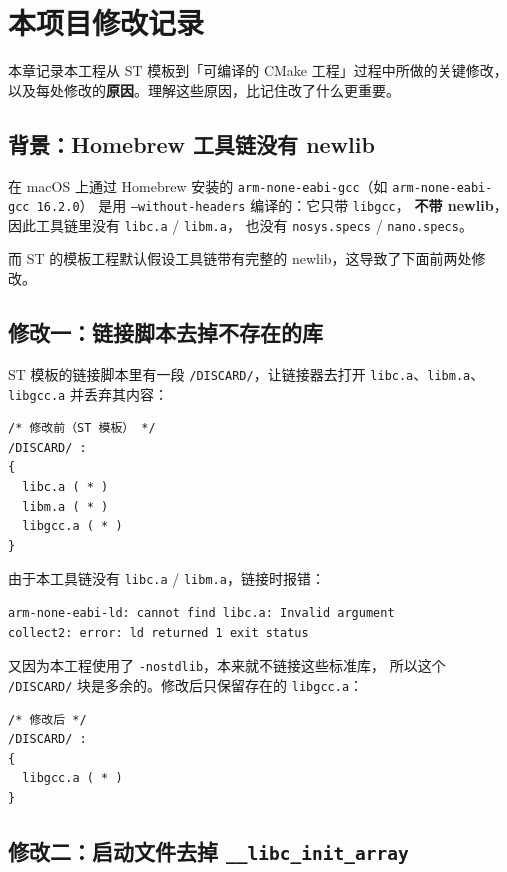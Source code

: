 \section{本项目修改记录}

本章记录本工程从 ST 模板到「可编译的 CMake 工程」过程中所做的关键修改，
以及每处修改的\textbf{原因}。理解这些原因，比记住改了什么更重要。

\subsection{背景：Homebrew 工具链没有 newlib}

在 macOS 上通过 Homebrew 安装的
\texttt{arm-none-eabi-gcc}（如 \texttt{arm-none-eabi-gcc 16.2.0}）
是用 \texttt{--without-headers} 编译的：它只带 \texttt{libgcc}，
\textbf{不带 newlib}，因此工具链里没有 \texttt{libc.a} / \texttt{libm.a}，
也没有 \texttt{nosys.specs} / \texttt{nano.specs}。

而 ST 的模板工程默认假设工具链带有完整的 newlib，这导致了下面前两处修改。

\subsection{修改一：链接脚本去掉不存在的库}

ST 模板的链接脚本里有一段 \texttt{/DISCARD/}，让链接器去打开
\texttt{libc.a}、\texttt{libm.a}、\texttt{libgcc.a} 并丢弃其内容：

\begin{lstlisting}[style=generic]
/* 修改前（ST 模板） */
/DISCARD/ :
{
  libc.a ( * )
  libm.a ( * )
  libgcc.a ( * )
}
\end{lstlisting}

由于本工具链没有 \texttt{libc.a} / \texttt{libm.a}，链接时报错：

\begin{lstlisting}[style=generic]
arm-none-eabi-ld: cannot find libc.a: Invalid argument
collect2: error: ld returned 1 exit status
\end{lstlisting}

又因为本工程使用了 \texttt{-nostdlib}，本来就不链接这些标准库，
所以这个 \texttt{/DISCARD/} 块是多余的。修改后只保留存在的 \texttt{libgcc.a}：

\begin{lstlisting}[style=generic]
/* 修改后 */
/DISCARD/ :
{
  libgcc.a ( * )
}
\end{lstlisting}

\subsection{修改二：启动文件去掉 \texttt{\_\_libc\_init\_array}}

